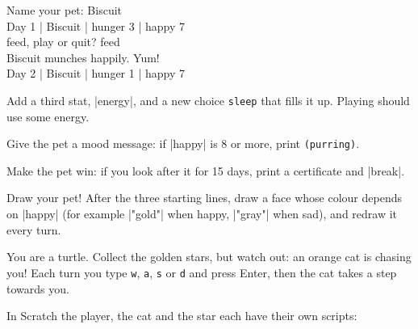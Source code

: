 \begin{outputbox}
Name your pet: Biscuit\\
Day 1 | Biscuit | hunger 3 | happy 7\\
feed, play or quit? feed\\
Biscuit munches happily. Yum!\\
Day 2 | Biscuit | hunger 1 | happy 7
\end{outputbox}

\begin{challenge}[Level up]
\tick Add a third stat, \py|energy|, and a new choice \texttt{sleep} that fills it up. Playing should use some energy.\par
\tick Give the pet a mood message: if \py|happy| is 8 or more, print \texttt{(purring)}.\par
\tick Make the pet win: if you look after it for 15 days, print a certificate and \py|break|.\par
\tick Draw your pet! After the three starting lines, draw a face whose colour depends on \py|happy| (for example \py|"gold"| when happy, \py|"gray"| when sad), and redraw it every turn.
\end{challenge}


You are a turtle. Collect the golden stars, but watch out: an orange cat is chasing you! Each turn you type \texttt{w}, \texttt{a}, \texttt{s} or \texttt{d} and press Enter, then the cat takes a step towards you.

In Scratch the player, the cat and the star each have their own scripts:

